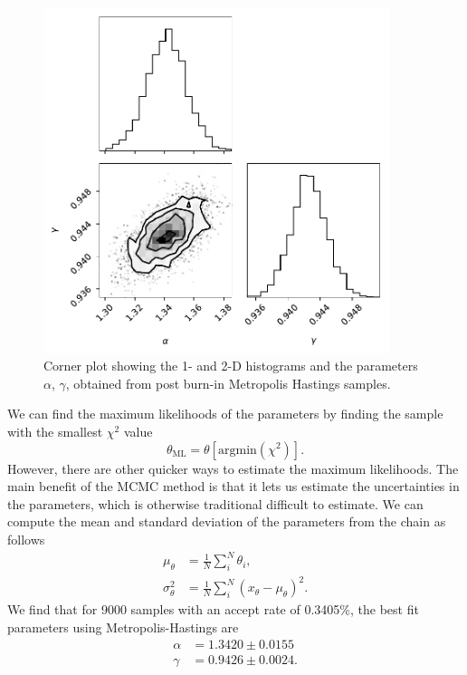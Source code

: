\documentclass{article}
\begin{document}
\begin{figure}
    \centering
    \includegraphics[width=0.9\textwidth]{figs/mh_corner.pdf}
    \caption{Corner plot showing the 1- and 2-D histograms and the parameters $\alpha$, $\gamma$, obtained from post burn-in Metropolis Hastings samples.}
    \label{fig:mh_corner}
\end{figure}

We can find the maximum likelihoods of the parameters by finding the sample with the smallest $\chi^2$ value
\begin{equation}
    \theta_\mathrm{ML} = \theta[\mathrm{argmin}(\chi^2)].
\end{equation}
However, there are other quicker ways to estimate the maximum likelihoods. The main benefit of the MCMC method is that it lets us estimate the uncertainties in the parameters, which is otherwise traditional difficult to estimate. We can compute the mean and standard deviation of the parameters from the chain as follows
\begin{align}
    \mu_\theta &= \frac{1}{N} \sum_i^N \theta_i,\\
    \sigma_\theta^2 &= \frac{1}{N} \sum_i^N (x_\theta - \mu_\theta)^2.
\end{align}
We find that for 9000 samples with an accept rate of 0.3405\%, the best fit parameters using Metropolis-Hastings are
\begin{align*}
    \alpha &= 1.3420 \pm  0.0155\\
    \gamma &= 0.9426 \pm  0.0024.
\end{align*}
\end{document}
